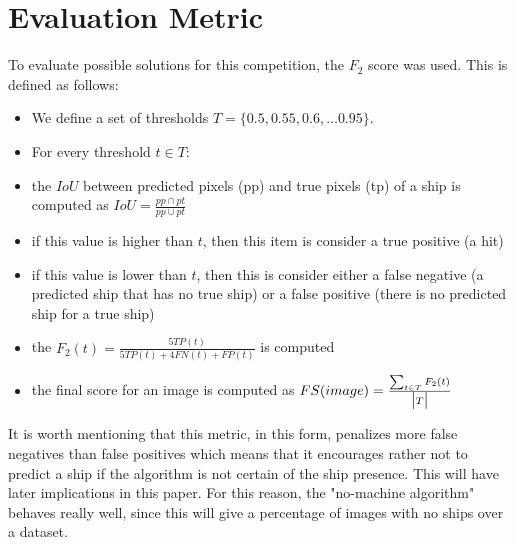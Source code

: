 \section{Evaluation Metric}
To evaluate possible solutions for this competition, the $F_2$ score was used. This is defined as follows:
\begin{itemize}
	\item We define a set of thresholds $T = \{0.5, 0.55, 0.6, \dots 0.95\}$.
	\item For every threshold $t \in T$:
	\item the $IoU$ between predicted pixels (pp) and true pixels (tp) of a ship is computed as $IoU = \frac{pp \cap pt}{pp \cup pt}$
	\item if this value is higher than $t$, then this item is consider a true positive (a hit)
	\item if this value is lower than $t$, then this is consider either a false negative (a predicted ship that has no true ship) or a false positive (there is no predicted ship for a true ship)
	\item the $F_2(t) =\frac{5TP(t)}{5TP(t) +4FN(t) + FP(t)}$ is computed
	\item the final score for an image is computed as $FS(image) = \frac{\sum_{t \in T} F_2(t)}{\big{|}T\big{|}}$
\end{itemize}

It is worth mentioning that this metric, in this form, penalizes more false negatives than false positives which means that it encourages rather not to predict a ship if the algorithm is not certain of the ship presence. This will have later implications in this paper. For this reason, the "no-machine algorithm" behaves really well, since this will give a percentage of images with no ships over a dataset.